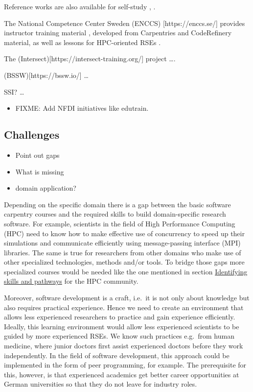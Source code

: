 \documentclass[a4paper
]{article}
\providecommand{\tightlist}{%
  \setlength{\itemsep}{0pt}\setlength{\parskip}{0pt}}
\begin{document}
Reference works are also available for self-study \autocite{Fogel2005},
\autocite{Irving2021}.

The National Competence Center Sweden (ENCCS) {[}https://enccs.se/{]}
provides instructor training material
\autocite{ENCCSInstructorTraining}, \autocite{ENCCS2022} developed from
Carpentries and CodeRefinery material, as well as lessons for
HPC-oriented RSEs \autocite{ENCCSLessons}.

The (Intersect){[}https://intersect-training.org/{]} project \ldots.

(BSSW){[}https://bssw.io/{]} \ldots{}

SSI? \autocite{Crouch2013} \ldots{}

\begin{itemize}
\tightlist
\item
  FIXME: Add NFDI initiatives like edutrain.
\end{itemize}

\hypertarget{challenges}{%
\subsection{Challenges}\label{challenges}}

\begin{itemize}
\tightlist
\item
  Point out gaps
\item
  What is missing
\item
  domain application?
\end{itemize}

Depending on the specific domain there is a gap between the basic
software carpentry courses and the required skills to build
domain-specific research software. For example, scientists in the field
of High Performance Computing (HPC) need to know how to make effective
use of concurrency to speed up their simulations and communicate
efficiently using message-passing interface (MPI) libraries. The same is
true for researchers from other domains who make use of other
specialized technologies, methods and/or tools. To bridge those gaps
more specialized courses would be needed like the one mentioned in
section \protect\hyperlink{identifying-skills-and-pathways}{Identifying
skills and pathways} for the HPC community.

Moreover, software development is a craft, i.e.~it is not only about
knowledge but also requires practical experience. Hence we need to
create an environment that allows less experienced researchers to
practice and gain experience efficiently. Ideally, this learning
environment would allow less experienced scientists to be guided by more
experienced RSEs. We know such practices e.g.~from human medicine, where
junior doctors first assist experienced doctors before they work
independently. In the field of software development, this approach could
be implemented in the form of peer programming, for example. The
prerequisite for this, however, is that experienced academics get better
career opportunities at German universities so that they do not leave
for industry roles.
\end{document}
